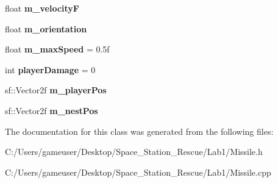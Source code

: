 \begin{DoxyCompactItemize}
\mbox{\label{class_missile_a24ae8e5b654c799c373ce0a7a857575c}} 
float {\bfseries m\+\_\+velocityF}
\item 
\mbox{\label{class_missile_af12716759ccd2413a5a263c86a16e5c4}} 
float {\bfseries m\+\_\+orientation}
\item 
\mbox{\label{class_missile_a3ccc502b5011696ebc71f204e7ff9a6a}} 
float {\bfseries m\+\_\+max\+Speed} = 0.\+5f
\item 
\mbox{\label{class_missile_a673358086a6cd8ebf2003a8ac2a8dfed}} 
int {\bfseries player\+Damage} = 0
\item 
\mbox{\label{class_missile_aac6f30b12d72dcd1533f70b28a5a4e52}} 
sf\+::\+Vector2f {\bfseries m\+\_\+player\+Pos}
\item 
\mbox{\label{class_missile_adb7636e214da483237cf0bd8d0f1ea29}} 
sf\+::\+Vector2f {\bfseries m\+\_\+nest\+Pos}
\end{DoxyCompactItemize}


The documentation for this class was generated from the following files\+:\begin{DoxyCompactItemize}
\item 
C\+:/\+Users/gameuser/\+Desktop/\+Space\+\_\+\+Station\+\_\+\+Rescue/\+Lab1/Missile.\+h\item 
C\+:/\+Users/gameuser/\+Desktop/\+Space\+\_\+\+Station\+\_\+\+Rescue/\+Lab1/Missile.\+cpp\end{DoxyCompactItemize}
